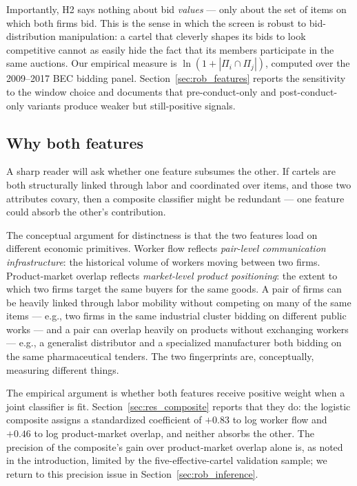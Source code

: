Importantly, H2 says nothing about bid \emph{values} --- only about the set of items on which both firms bid. This is the sense in which the screen is robust to bid-distribution manipulation: a cartel that cleverly shapes its bids to look competitive cannot as easily hide the fact that its members participate in the same auctions. Our empirical measure is $\ln(1 + |\Pi_i \cap \Pi_j|)$, computed over the 2009--2017 BEC bidding panel. Section~\ref{sec:rob_features} reports the sensitivity to the window choice and documents that pre-conduct-only and post-conduct-only variants produce weaker but still-positive signals.

\subsection{Why both features}

A sharp reader will ask whether one feature subsumes the other. If cartels are both structurally linked through labor and coordinated over items, and those two attributes covary, then a composite classifier might be redundant --- one feature could absorb the other's contribution.

The conceptual argument for distinctness is that the two features load on different economic primitives. Worker flow reflects \emph{pair-level communication infrastructure}: the historical volume of workers moving between two firms. Product-market overlap reflects \emph{market-level product positioning}: the extent to which two firms target the same buyers for the same goods. A pair of firms can be heavily linked through labor mobility without competing on many of the same items --- e.g., two firms in the same industrial cluster bidding on different public works --- and a pair can overlap heavily on products without exchanging workers --- e.g., a generalist distributor and a specialized manufacturer both bidding on the same pharmaceutical tenders. The two fingerprints are, conceptually, measuring different things.

The empirical argument is whether both features receive positive weight when a joint classifier is fit. Section~\ref{sec:res_composite} reports that they do: the logistic composite assigns a standardized coefficient of $+0.83$ to log worker flow and $+0.46$ to log product-market overlap, and neither absorbs the other. The precision of the composite's gain over product-market overlap alone is, as noted in the introduction, limited by the five-effective-cartel validation sample; we return to this precision issue in Section~\ref{sec:rob_inference}.


